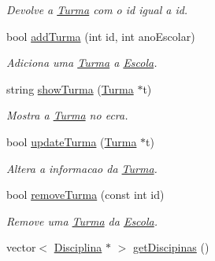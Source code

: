 \begin{DoxyCompactItemize}
\begin{DoxyCompactList}\small\item\em Devolve a \hyperlink{class_turma}{Turma} com o id igual a id. \end{DoxyCompactList}\item 
\hypertarget{class_escola_a86d547f74fe935bfd8bdf3cd35d25860}{bool \hyperlink{class_escola_a86d547f74fe935bfd8bdf3cd35d25860}{add\-Turma} (int id, int ano\-Escolar)}\label{class_escola_a86d547f74fe935bfd8bdf3cd35d25860}

\begin{DoxyCompactList}\small\item\em Adiciona uma \hyperlink{class_turma}{Turma} a \hyperlink{class_escola}{Escola}. \end{DoxyCompactList}\item 
\hypertarget{class_escola_a91096932c5326cb2e5c30cbd860c126c}{string \hyperlink{class_escola_a91096932c5326cb2e5c30cbd860c126c}{show\-Turma} (\hyperlink{class_turma}{Turma} $\ast$t)}\label{class_escola_a91096932c5326cb2e5c30cbd860c126c}

\begin{DoxyCompactList}\small\item\em Mostra a \hyperlink{class_turma}{Turma} no ecra. \end{DoxyCompactList}\item 
\hypertarget{class_escola_a50eb8daf94842be3184daa133140157d}{bool \hyperlink{class_escola_a50eb8daf94842be3184daa133140157d}{update\-Turma} (\hyperlink{class_turma}{Turma} $\ast$t)}\label{class_escola_a50eb8daf94842be3184daa133140157d}

\begin{DoxyCompactList}\small\item\em Altera a informacao da \hyperlink{class_turma}{Turma}. \end{DoxyCompactList}\item 
\hypertarget{class_escola_a4011a23d4f49827e7cc74ea5739e9033}{bool \hyperlink{class_escola_a4011a23d4f49827e7cc74ea5739e9033}{remove\-Turma} (const int id)}\label{class_escola_a4011a23d4f49827e7cc74ea5739e9033}

\begin{DoxyCompactList}\small\item\em Remove uma \hyperlink{class_turma}{Turma} da \hyperlink{class_escola}{Escola}. \end{DoxyCompactList}\item 
\hypertarget{class_escola_a733893af8f3535eebe4624525945589d}{vector$<$ \hyperlink{class_disciplina}{Disciplina} $\ast$ $>$ \hyperlink{class_escola_a733893af8f3535eebe4624525945589d}{get\-Discipinas} ()}\label{class_escola_a733893af8f3535eebe4624525945589d}


\end{DoxyCompactItemize}
